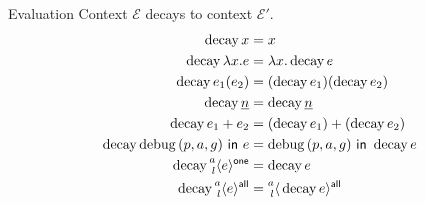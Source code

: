 

 Evaluation Context \(\mathcal{E}\) decays to context \(\mathcal{E}'\).
\[
  \begin{aligned}
    \Decay{x} &= x \\
    \Decay{\Lam{x}{e}} &= \Lam{x}{\Decay{e}} \\
    \Decay{e_1(e_2)} &= (\Decay{e_1})(\Decay{e_2}) \\
    \Decay{\Nat{n}} &= \Decay{\Nat{n}} \\
    \Decay{e_1 + e_2} &= (\Decay{e_1}) + (\Decay{e_2}) \\
    \Decay{\Filter{(p, a, g)}{e}} &= \Filter{(p, a, g)}{\Decay{e}} \\
    \Decay{\Residue{a}{\GasOne}{l}{e}} &= \Decay{e} \\
    \Decay{\Residue{a}{\GasAll}{l}{e}} &= \Residue{a}{\GasAll}{l}{\Decay{e}}
  \end{aligned}
\]


